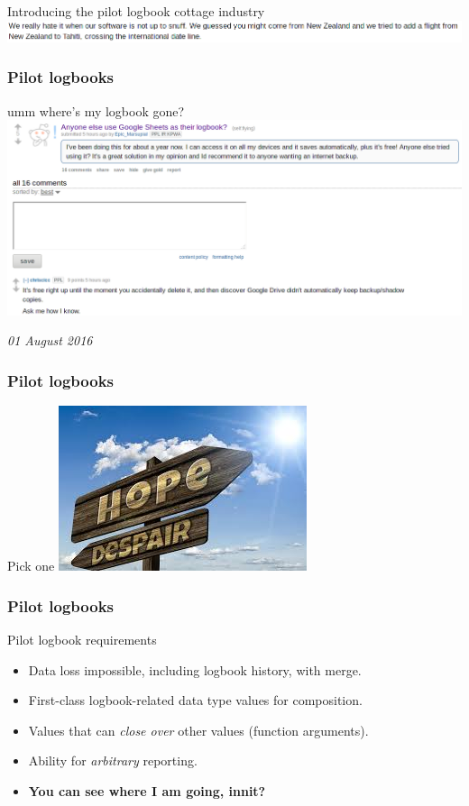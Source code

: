 \begin{frame}
\begin{block}{Introducing the pilot logbook cottage industry}
\includegraphics[height=0.05\textheight]{image/logbook-6.png}
\end{block}
\end{frame}

\begin{frame}
\frametitle{Pilot logbooks}
\begin{block}{umm where's my logbook gone?}
\includegraphics[height=0.4\textheight]{image/logbook-7.png}
\end{block}
\par
\tiny{\emph{01 August 2016}}
\end{frame}

\begin{frame}
\frametitle{Pilot logbooks}
\begin{block}{Pick one}
\includegraphics[height=0.4\textheight]{image/hope-despair.jpg}
\end{block}
\end{frame}

\begin{frame}
\frametitle{Pilot logbooks}
\begin{block}{Pilot logbook requirements}
\begin{itemize}
\item<1-> Data loss impossible, including logbook history, with merge.
\item<2-> First-class logbook-related data type values for composition.
\item<3-> Values that can \emph{close over} other values (function arguments).
\item<4-> Ability for \emph{arbitrary} reporting.
\item<5-> \textbf{You can see where I am going, innit?}
\end{itemize}
\end{block}
\end{frame}

